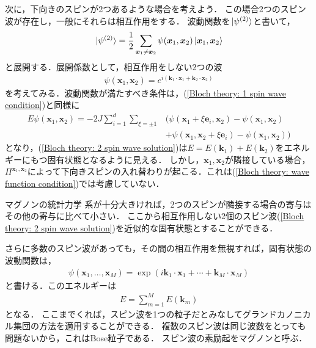 \documentclass[dvipdfmx,9pt]{beamer}
\numberwithin{equation}{section}
\begin{document}
\begin{frame}
    次に，下向きのスピンが2つあるような場合を考えよう．
    この場合2つのスピン波が存在し，一般にそれらは相互作用をする．
    波動関数を$\ket*{\psi^{(2)}}$と書いて，
    \begin{align}
        \ket*{\psi^{(2)}} = \frac{1}{2} \sum_{\bm{x}_1 \ne \bm{x}_2} \psi(\bm{x}_1, \bm{x}_2) \ket{\bm{x}_1, \bm{x}_2}
    \end{align}
    と展開する．展開係数として，相互作用をしない2つの波
    \begin{align}
        \psi(\bm{x}_1, \bm{x}_2) = e^{i(\bm{k}_1\cdot \bm{x}_1 + \bm{k}_2 \cdot \bm{x}_2)} 
        \label{Bloch theory: 2 spin wave solution}
    \end{align}
    を考えてみる．波動関数が満たすべき条件は，(\ref{Bloch theory: 1 spin wave condition})と同様に
    \begin{align}
        \nonumber
        E\psi(\bm{x}_1, \bm{x}_2)
        = -2J \sum_{i=1}^d \sum_{\xi=\pm 1} &(\psi(\bm{x}_1 + \xi\bm{e}_i, \bm{x}_2) - \psi(\bm{x}_1, \bm{x}_2)
        \\ &
       +\psi(\bm{x}_1, \bm{x}_2 + \xi \bm{e}_i) - \psi(\bm{x}_1, \bm{x}_2))
       \label{Bloch theory: wave function condition}
    \end{align}
    となり，(\ref{Bloch theory: 2 spin wave solution})は$E = E(\bm{k}_1) + E(\bm{k}_2)$をエネルギーにもつ固有状態となるように見える．
    しかし，$\bm{x}_1,\bm{x}_2$が隣接している場合，$\Pi^{\bm{x}_1,\bm{x}_2}$によって下向きスピンの入れ替わりが起こる．これは(\ref{Bloch theory: wave function condition})では考慮していない．
\end{frame}

\begin{frame}{マグノンの統計力学}
    系が十分大きければ，2つのスピンが隣接する場合の寄与はその他の寄与に比べて小さい．
    ここから相互作用しない2個のスピン波(\ref{Bloch theory: 2 spin wave solution})を近似的な固有状態とすることができる．

    さらに多数のスピン波があっても，その間の相互作用を無視すれば，固有状態の波動関数は，
    \begin{align}
        \psi(\bm{x}_1, \ldots, \bm{x}_M) = \exp(i \bm{k}_1 \cdot \bm{x}_1 + \cdots + \bm{k}_M \cdot \bm{x}_M)
    \end{align}
    と書ける．このエネルギーは
    \begin{align}
        E = \sum_{m=1}^M E(\bm{k}_m)
    \end{align}
    となる．
    ここまでくれば，スピン波を1つの粒子だとみなしてグランドカノニカル集団の方法を適用することができる．
    複数のスピン波は同じ波数をとっても問題ないから，これはBose粒子である．
    スピン波の素励起をマグノンと呼ぶ．
\end{frame}
\end{document}
